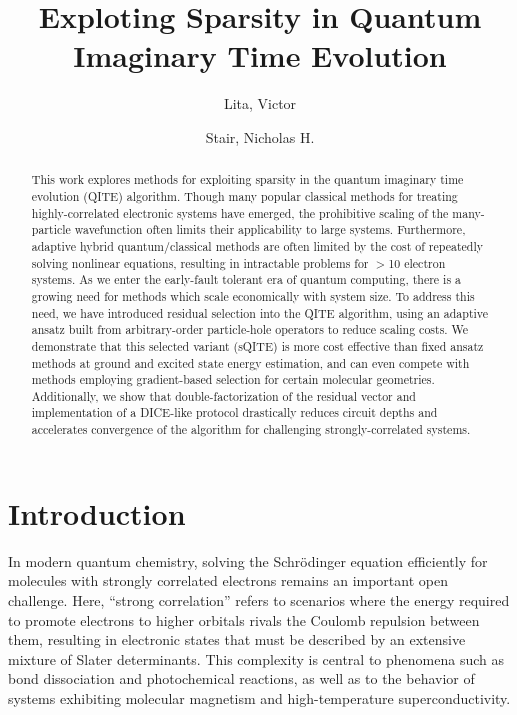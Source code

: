 \documentclass[aip,jcp,amsmath,amssymb, reprint]{revtex4-1}
\begin{document}
\title{Exploting Sparsity in Quantum Imaginary Time Evolution}
\author{Lita, Victor}
\author{Stair, Nicholas H.}

\begin{abstract}
This work explores methods for exploiting sparsity in the quantum imaginary time evolution (QITE) algorithm. Though many popular classical methods for treating highly-correlated electronic systems have emerged, the prohibitive scaling of the many-particle wavefunction often limits their applicability to large systems. Furthermore, adaptive hybrid quantum/classical methods are often limited by the cost of repeatedly solving nonlinear equations, resulting in intractable problems for $>$10 electron systems. As we enter the early-fault tolerant era of quantum computing, there is a growing need for methods which scale economically with system size. To address this need, we have introduced residual selection into the QITE algorithm, using an adaptive ansatz built from arbitrary-order particle-hole operators to reduce scaling costs. We demonstrate that this selected variant (sQITE) is more cost effective than fixed ansatz methods at ground and excited state energy estimation, and can even compete with methods employing gradient-based selection for certain molecular geometries. Additionally, we show that double-factorization of the residual vector and implementation of a DICE-like protocol drastically reduces circuit depths and accelerates convergence of the algorithm for challenging strongly-correlated systems.

\end{abstract}

\linenumbersep=24pt

\maketitle

\section{\label{sec:intro}Introduction}


In modern quantum chemistry, solving the Schrödinger equation efficiently for molecules with strongly correlated electrons remains an important open challenge.\cite{Laughlin2000TheTheory}
Here, “strong correlation” refers to scenarios where the energy required to promote electrons to higher orbitals rivals the Coulomb repulsion between them, resulting in electronic states that must be described by an extensive mixture of Slater determinants.\cite{Tew2007ElectronCorrelation, kutzelnigg2003theory}
This complexity is central to phenomena such as bond dissociation and photochemical reactions,\cite{Mok1996DynamicalAnd,Holmes2017ExcitedStates} as well as to the behavior of systems exhibiting molecular magnetism\cite{malrieu2014magnetic} and high-temperature superconductivity.\cite{Lee2007HighTemp}
\end{document}
